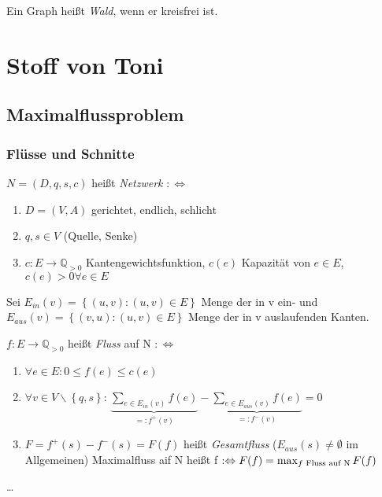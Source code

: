 \documentclass[10pt]{scrbook}
\begin{document}
\begin{Def}
Ein Graph heißt \emph{Wald}, wenn er kreisfrei ist.
\end{Def}

\section{Stoff von Toni}

\subsection{Maximalflussproblem}

\subsubsection{Flüsse und Schnitte}

\begin{Def}
$N=(D, q, s, c)$ heißt \emph{Netzwerk} $:\Leftrightarrow$
\begin{enumerate}
\item $D=(V, A)$ gerichtet, endlich, schlicht
\item $q, s\in V$ (Quelle, Senke)
\item $c: E\rightarrow \mathbb{Q}_{>0}$ Kantengewichtsfunktion, $c(e)$ Kapazität von $e\in E$, $c(e)>0 \forall e\in E$
\end{enumerate}
\end{Def}

\begin{Def}
Sei $E_{in}(v)=\left\{(u, v): (u, v)\in E\right\}$ Menge der in v ein- und $E_{aus}(v)=\left\{(v, u): (u, v)\in E\right\}$ Menge der in v auslaufenden Kanten.

$f: E\rightarrow  \mathbb{Q}_{>0}$ heißt \emph{Fluss} auf N $:\Leftrightarrow$
\begin{enumerate}
\item $\forall e\in E: 0\leq f(e)\leq c(e)$
\item $\forall v\in V\backslash \left\{q, s\right\}$: $\underbrace{\sum_{e\in E_{in}(v)} f(e)}_{=: f^+(v)}-\underbrace{\sum_{e\in E_{aus}(v)} f(e)}_{=:f^-(v)}=0$
\item $F=f^+(s)-f^-(s)=F(f)$ heißt \emph{Gesamtfluss} ($E_{aus}(s)\neq \emptyset$ im Allgemeinen) Maximalfluss aif N heißt f $:\Leftrightarrow F(f)=\max_{f\textnormal{ Fluss auf N}} F(f)$
\end{enumerate}
\end{Def}

\begin{Bsp}
\ldots
\end{Bsp}
\end{document}
